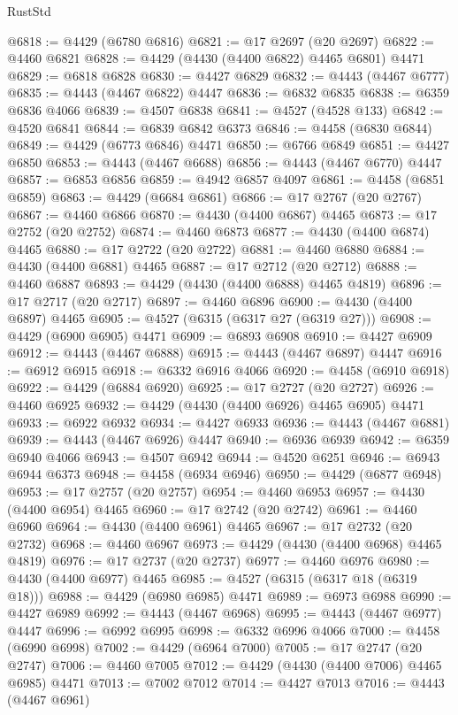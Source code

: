 \begin{lexlean}{RustStd}
\begin{coremodule}
@6818 := @4429 (@6780 @6816)
@6821 := @17 @2697 (@20 @2697)
@6822 := @4460 @6821
@6828 := @4429 (@4430 (@4400 @6822) @4465 @6801) @4471
@6829 := @6818 @6828
@6830 := @4427 @6829
@6832 := @4443 (@4467 @6777)
@6835 := @4443 (@4467 @6822) @4447
@6836 := @6832 @6835
@6838 := @6359 @6836 @4066
@6839 := @4507 @6838
@6841 := @4527 (@4528 @133)
@6842 := @4520 @6841
@6844 := @6839 @6842 @6373
@6846 := @4458 (@6830 @6844)
@6849 := @4429 (@6773 @6846) @4471
@6850 := @6766 @6849
@6851 := @4427 @6850
@6853 := @4443 (@4467 @6688)
@6856 := @4443 (@4467 @6770) @4447
@6857 := @6853 @6856
@6859 := @4942 @6857 @4097
@6861 := @4458 (@6851 @6859)
@6863 := @4429 (@6684 @6861)
@6866 := @17 @2767 (@20 @2767)
@6867 := @4460 @6866
@6870 := @4430 (@4400 @6867) @4465
@6873 := @17 @2752 (@20 @2752)
@6874 := @4460 @6873
@6877 := @4430 (@4400 @6874) @4465
@6880 := @17 @2722 (@20 @2722)
@6881 := @4460 @6880
@6884 := @4430 (@4400 @6881) @4465
@6887 := @17 @2712 (@20 @2712)
@6888 := @4460 @6887
@6893 := @4429 (@4430 (@4400 @6888) @4465 @4819)
@6896 := @17 @2717 (@20 @2717)
@6897 := @4460 @6896
@6900 := @4430 (@4400 @6897) @4465
@6905 := @4527 (@6315 (@6317 @27 (@6319 @27)))
@6908 := @4429 (@6900 @6905) @4471
@6909 := @6893 @6908
@6910 := @4427 @6909
@6912 := @4443 (@4467 @6888)
@6915 := @4443 (@4467 @6897) @4447
@6916 := @6912 @6915
@6918 := @6332 @6916 @4066
@6920 := @4458 (@6910 @6918)
@6922 := @4429 (@6884 @6920)
@6925 := @17 @2727 (@20 @2727)
@6926 := @4460 @6925
@6932 := @4429 (@4430 (@4400 @6926) @4465 @6905) @4471
@6933 := @6922 @6932
@6934 := @4427 @6933
@6936 := @4443 (@4467 @6881)
@6939 := @4443 (@4467 @6926) @4447
@6940 := @6936 @6939
@6942 := @6359 @6940 @4066
@6943 := @4507 @6942
@6944 := @4520 @6251
@6946 := @6943 @6944 @6373
@6948 := @4458 (@6934 @6946)
@6950 := @4429 (@6877 @6948)
@6953 := @17 @2757 (@20 @2757)
@6954 := @4460 @6953
@6957 := @4430 (@4400 @6954) @4465
@6960 := @17 @2742 (@20 @2742)
@6961 := @4460 @6960
@6964 := @4430 (@4400 @6961) @4465
@6967 := @17 @2732 (@20 @2732)
@6968 := @4460 @6967
@6973 := @4429 (@4430 (@4400 @6968) @4465 @4819)
@6976 := @17 @2737 (@20 @2737)
@6977 := @4460 @6976
@6980 := @4430 (@4400 @6977) @4465
@6985 := @4527 (@6315 (@6317 @18 (@6319 @18)))
@6988 := @4429 (@6980 @6985) @4471
@6989 := @6973 @6988
@6990 := @4427 @6989
@6992 := @4443 (@4467 @6968)
@6995 := @4443 (@4467 @6977) @4447
@6996 := @6992 @6995
@6998 := @6332 @6996 @4066
@7000 := @4458 (@6990 @6998)
@7002 := @4429 (@6964 @7000)
@7005 := @17 @2747 (@20 @2747)
@7006 := @4460 @7005
@7012 := @4429 (@4430 (@4400 @7006) @4465 @6985) @4471
@7013 := @7002 @7012
@7014 := @4427 @7013
@7016 := @4443 (@4467 @6961)

\end{coremodule}
\end{lexlean}
